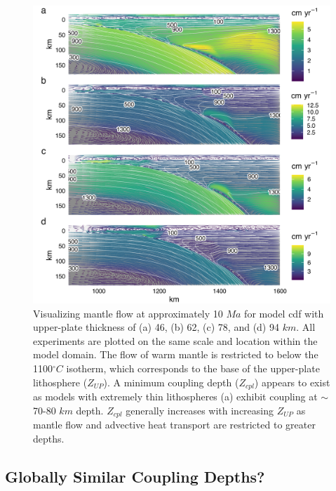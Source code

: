 \begin{figure}[htbp]

{\centering \includegraphics[width=1\linewidth,]{assets/figs/chpt2/fig7} 

}

\caption[Visualizing mantle flow and coupling by upper-plate thickness]{Visualizing mantle flow at approximately 10 $Ma$ for model cdf with upper-plate thickness of (a) 46, (b) 62, (c) 78, and (d) 94 $km$. All experiments are plotted on the same scale and location within the model domain. The flow of warm mantle is restricted to below the 1100$^{\circ}C$ isotherm, which corresponds to the base of the upper-plate lithosphere ($Z_{UP}$). A minimum coupling depth ($Z_{cpl}$) appears to exist as models with extremely thin lithospheres (a) exhibit coupling at $\sim$ 70-80 $km$ depth. $Z_{cpl}$ generally increases with increasing $Z_{UP}$ as mantle flow and advective heat transport are restricted to greater depths.}\label{fig:streams}
\end{figure}

\hypertarget{globally-similar-coupling-depths}{%
\subsection{Globally Similar Coupling Depths?}\label{globally-similar-coupling-depths}}

